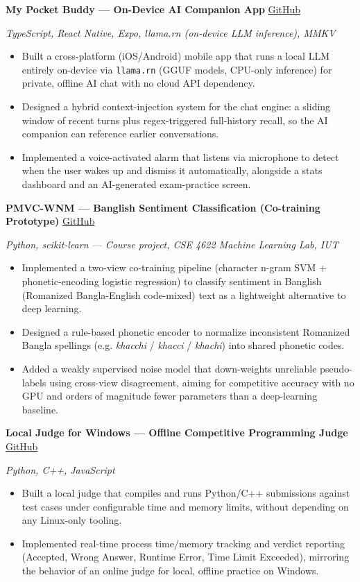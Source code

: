 \documentclass[10.5pt,a4paper]{article}
\newcommand{\heading}[2]{%
  \noindent\textbf{#1} \hfill #2\par
}
\begin{document}
\heading{My Pocket Buddy --- On-Device AI Companion App}{\href{https://github.com/Rafat-Pantho/my-pocket-buddy}{GitHub}}
\textit{TypeScript, React Native, Expo, llama.rn (on-device LLM inference), MMKV}
\begin{itemize}
  \item Built a cross-platform (iOS/Android) mobile app that runs a local LLM entirely on-device via
        \texttt{llama.rn} (GGUF models, CPU-only inference) for private, offline AI chat with no cloud API
        dependency.
  \item Designed a hybrid context-injection system for the chat engine: a sliding window of recent turns
        plus regex-triggered full-history recall, so the AI companion can reference earlier conversations.
  \item Implemented a voice-activated alarm that listens via microphone to detect when the user wakes up and
        dismiss it automatically, alongside a stats dashboard and an AI-generated exam-practice screen.
\end{itemize}

\heading{PMVC-WNM --- Banglish Sentiment Classification (Co-training Prototype)}{\href{https://github.com/Rafat-Pantho/ML-Banglish-co-training-prototype}{GitHub}}
\textit{Python, scikit-learn --- Course project, CSE 4622 Machine Learning Lab, IUT}
\begin{itemize}
  \item Implemented a two-view co-training pipeline (character n-gram SVM + phonetic-encoding logistic
        regression) to classify sentiment in Banglish (Romanized Bangla-English code-mixed) text as a
        lightweight alternative to deep learning.
  \item Designed a rule-based phonetic encoder to normalize inconsistent Romanized Bangla spellings (e.g.
        \textit{khacchi} / \textit{khacci} / \textit{khachi}) into shared phonetic codes.
  \item Added a weakly supervised noise model that down-weights unreliable pseudo-labels using cross-view
        disagreement, aiming for competitive accuracy with no GPU and orders of magnitude fewer parameters
        than a deep-learning baseline.
\end{itemize}

\heading{Local Judge for Windows --- Offline Competitive Programming Judge}{\href{https://github.com/Rafat-Pantho/localjudge-for-windows}{GitHub}}
\textit{Python, C++, JavaScript}
\begin{itemize}
  \item Built a local judge that compiles and runs Python/C++ submissions against test cases under
        configurable time and memory limits, without depending on any Linux-only tooling.
  \item Implemented real-time process time/memory tracking and verdict reporting (Accepted, Wrong Answer,
        Runtime Error, Time Limit Exceeded), mirroring the behavior of an online judge for local, offline
        practice on Windows.
\end{itemize}
\end{document}
